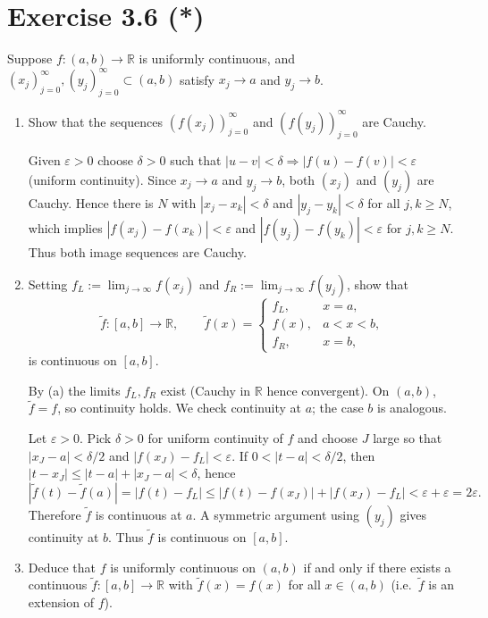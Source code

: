 

\section*{Exercise 3.6 (*)}
Suppose $f:(a,b)\to\mathbb{R}$ is uniformly continuous, and $(x_j)_{j=0}^\infty,(y_j)_{j=0}^\infty\subset(a,b)$ satisfy
$x_j\to a$ and $y_j\to b$.
\begin{enumerate}
\renewcommand\labelenumi{(\alph{enumi})}
\item Show that the sequences $(f(x_j))_{j=0}^\infty$ and $(f(y_j))_{j=0}^\infty$ are Cauchy.

\begin{solution}
Given $\varepsilon>0$ choose $\delta>0$ such that $|u-v|<\delta\Rightarrow |f(u)-f(v)|<\varepsilon$ (uniform continuity).
Since $x_j\to a$ and $y_j\to b$, both $(x_j)$ and $(y_j)$ are Cauchy. Hence there is $N$ with
$|x_j-x_k|<\delta$ and $|y_j-y_k|<\delta$ for all $j,k\ge N$, which implies
$|f(x_j)-f(x_k)|<\varepsilon$ and $|f(y_j)-f(y_k)|<\varepsilon$ for $j,k\ge N$. Thus both image sequences are Cauchy.
\end{solution}

\item Setting $f_L:=\lim_{j\to\infty}f(x_j)$ and $f_R:=\lim_{j\to\infty}f(y_j)$, show that
\[
\tilde f:[a,b]\to\mathbb{R},\qquad
\tilde f(x)=
\begin{cases}
f_L,& x=a,\\
f(x),& a<x<b,\\
f_R,& x=b,
\end{cases}
\]
is continuous on $[a,b]$.

\begin{solution}
By (a) the limits $f_L,f_R$ exist (Cauchy in $\mathbb{R}$ hence convergent). On $(a,b)$, $\tilde f=f$, so continuity holds.
We check continuity at $a$; the case $b$ is analogous.

Let $\varepsilon>0$. Pick $\delta>0$ for uniform continuity of $f$ and choose $J$ large so that
$|x_J-a|<\delta/2$ and $|f(x_J)-f_L|<\varepsilon$. If $0<|t-a|<\delta/2$, then
$|t-x_J|\le |t-a|+|x_J-a|<\delta$, hence
\[
|\tilde f(t)-\tilde f(a)|=|f(t)-f_L|\le |f(t)-f(x_J)|+|f(x_J)-f_L|<\varepsilon+\varepsilon=2\varepsilon.
\]
Therefore $\tilde f$ is continuous at $a$. A symmetric argument using $(y_j)$ gives continuity at $b$.
Thus $\tilde f$ is continuous on $[a,b]$.
\end{solution}

\item Deduce that $f$ is uniformly continuous on $(a,b)$ if and only if there exists a continuous
$\tilde f:[a,b]\to\mathbb{R}$ with $\tilde f(x)=f(x)$ for all $x\in(a,b)$ (i.e.\ $\tilde f$ is an extension of $f$).


\end{enumerate}
